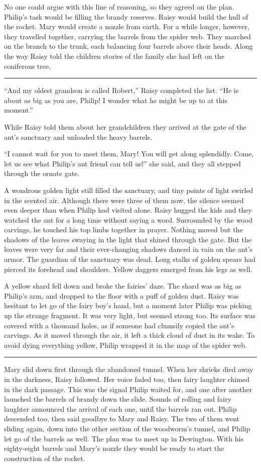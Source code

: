 \documentclass[10pt, draft]{memoir}
\renewcommand{\pfbreakdisplay}{\bigskip \ding{166} \bigskip}
\newcommand{\secbreak}{\fancybreak{\pfbreakdisplay}}
\begin{document}
No one could argue with this line of reasoning, so they agreed on the plan.
Philip's task would be filling the brandy reserves. Raisy would build the hull
of the rocket. Mary would create a nozzle from earth. For a while longer,
however, they travelled together, carrying the barrels from the spider web.
They marched on the branch to the trunk, each balancing four barrels above
their heads. Along the way Raisy told the children stories of the family she
had left on the coniferous tree.

\secbreak

``And my oldest grandson is called Robert,'' Raisy completed the list. ``He is
about as big as you are, Philip! I wonder what he might be up to at this
moment.''

While Raisy told them about her grandchildren they arrived at the gate of the
ant's sanctuary and unloaded the heavy barrels.

``I cannot wait for you to meet them, Mary! You will get along splendidly.
Come, let us see what Philip's ant friend can tell us!'' she said, and they all
stepped through the ornate gate.

A wondrous golden light still filled the sanctuary, and tiny points of light
swirled in the scented air. Although there were three of them now, the silence
seemed even deeper than when Philip had visited alone. Raisy hugged the kids
and they watched the ant for a long time without saying a word. Surrounded by
the wood carvings, he touched his top limbs together in prayer. Nothing moved
but the shadows of the leaves swaying in the light that shined through the
gate. But the leaves were very far and their ever-changing shadows danced in
vain on the ant's armor. The guardian of the sanctuary was dead. Long stalks of
golden spears had pierced its forehead and shoulders. Yellow daggers emerged
from his legs as well.

A yellow shard fell down and broke the fairies' daze. The shard was as big as
Philip's arm, and dropped to the floor with a puff of golden dust. Raisy was
hesitant to let go of the fairy boy's hand, but a moment later Philip was
picking up the strange fragment. It was very light, but seemed strong too. Its
surface was covered with a thousand holes, as if someone had clumsily copied
the ant's carvings. As it moved through the air, it left a thick cloud of dust
in its wake. To avoid dying everything yellow, Philip wrapped it in the map of
the spider web.

\secbreak

Mary slid down first through the abandoned tunnel. When her shrieks died away
in the darkness, Raisy followed. Her voice faded too, then fairy laughter
chimed in the dark passage. This was the signal Philip waited for, and one
after another launched the barrels of brandy down the slide. Sounds of rolling
and fairy laughter announced the arrival of each one, until the barrels ran
out. Philip descended too, then said goodbye to Mary and Raisy. The two of them
went sliding again, down into the other section of the woodworm's tunnel, and
Philip let go of the barrels as well. The plan was to meet up in Dewington.
With his eighty-eight barrels and Mary's nozzle they would be ready to start
the construction of the rocket.
\end{document}
